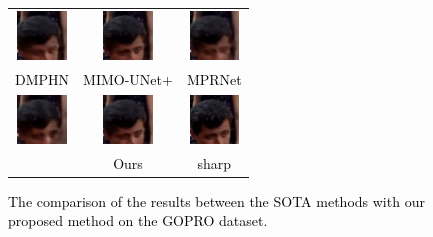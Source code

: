 \begin{sloppypar}
\begin{figure}
\begin{tabular}{ccc}
                \includegraphics[width=1.3cm,height=1.3cm]{./gopro1/GOPR0384_11_05_004004_DMPHN_3_5.png} &    \includegraphics[width=1.3cm,height=1.3cm]{./gopro1/GOPR0384_11_05_004004_MIMO_3_5.png} &    \includegraphics[width=1.3cm,height=1.3cm]{./gopro1/GOPR0384_11_05_004004_MPR_3_5.png}       \\
                \textcolor{black}{DMPHN} & \textcolor{black}{MIMO-UNet+} & \textcolor{black}{MPRNet} \\

                \includegraphics[width=1.3cm,height=1.3cm]{./gopro1/GOPR0384_11_05_004004_3_5_AD.png} & 
                \includegraphics[width=1.3cm,height=1.3cm]{./gopro1/GOPR0384_11_05_004004_ours_3_5.png} &    \includegraphics[width=1.3cm,height=1.3cm]{./gopro1/GOPR0384_11_05_004004_3_5_sharp.png}       \\
                \textcolor{black}{\cite{26}} & \textcolor{black}{Ours} & \textcolor{black}{sharp}
                
        \end{tabular}
        \caption{\textcolor{black}{The comparison of the results between the SOTA  methods with our proposed method on the GOPRO dataset.}}
        \label{figure9}
        \vspace{-0.5em}
\end{figure}


\end{sloppypar}
